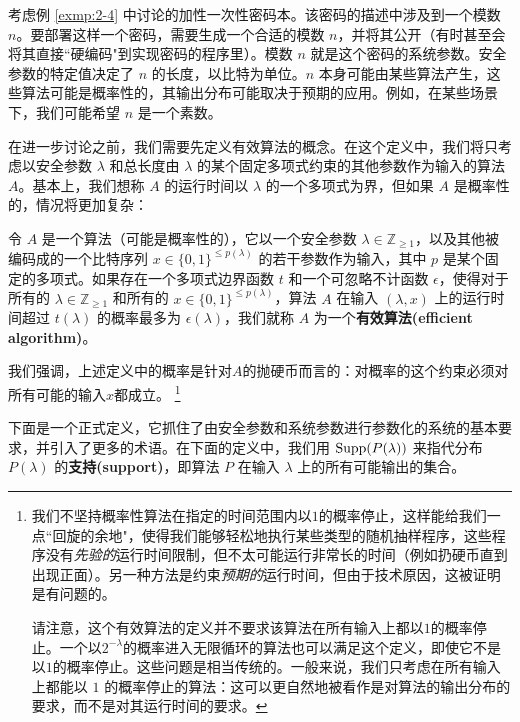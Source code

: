 \begin{example}\label{exmp:2-12}
考虑例 \ref{exmp:2-4} 中讨论的加性一次性密码本。该密码的描述中涉及到一个模数 $n$。要部署这样一个密码，需要生成一个合适的模数 $n$，并将其公开（有时甚至会将其直接``硬编码"到实现密码的程序里）。模数 $n$ 就是这个密码的系统参数。安全参数的特定值决定了 $n$ 的长度，以比特为单位。$n$ 本身可能由某些算法产生，这些算法可能是概率性的，其输出分布可能取决于预期的应用。例如，在某些场景下，我们可能希望 $n$ 是一个素数。
\end{example}

在进一步讨论之前，我们需要先定义有效算法的概念。在这个定义中，我们将只考虑以安全参数 $\lambda$ 和总长度由 $\lambda$ 的某个固定多项式约束的其他参数作为输入的算法 $A$。基本上，我们想称 $A$ 的运行时间以 $\lambda$ 的一个多项式为界，但如果 $A$ 是概率性的，情况将更加复杂：

\begin{definition}[有效算法]\label{def:2-8}
令 $A$ 是一个算法（可能是概率性的），它以一个安全参数 $\lambda\in\mathbb{Z}_{\geq1}$，以及其他被编码成的一个比特序列 $x\in\{0,1\}^{\leq p(\lambda)}$ 的若干参数作为输入，其中 $p$ 是某个固定的多项式。如果存在一个多项式边界函数 $t$ 和一个可忽略不计函数 $\epsilon$，使得对于所有的 $\lambda\in\mathbb{Z}_{\geq1}$ 和所有的 $x\in\{0,1\}^{\leq p(\lambda)}$，算法 $A$ 在输入 $(\lambda,x)$ 上的运行时间超过 $t(\lambda)$ 的概率最多为 $\epsilon(\lambda)$，我们就称 $A$ 为一个\textbf{有效算法(efficient algorithm)}。
\end{definition}

我们强调，上述定义中的概率是针对$A$的抛硬币而言的：对概率的这个约束必须对所有可能的输入$x$都成立。
\footnote{
\label{foot:2-1}
我们不坚持概率性算法在指定的时间范围内以$1$的概率停止，这样能给我们一点``回旋的余地"，使得我们能够轻松地执行某些类型的随机抽样程序，这些程序没有\emph{先验的}运行时间限制，但不太可能运行非常长的时间（例如扔硬币直到出现正面）。另一种方法是约束\emph{预期的}运行时间，但由于技术原因，这被证明是有问题的。

请注意，这个有效算法的定义并不要求该算法在所有输入上都以$1$的概率停止。一个以$2^{-\lambda}$的概率进入无限循环的算法也可以满足这个定义，即使它不是以$1$的概率停止。这些问题是相当传统的。一般来说，我们只考虑在所有输入上都能以 $1$ 的概率停止的算法：这可以更自然地被看作是对算法的输出分布的要求，而不是对其运行时间的要求。
}

\vspace{5pt}

下面是一个正式定义，它抓住了由安全参数和系统参数进行参数化的系统的基本要求，并引入了更多的术语。在下面的定义中，我们用 ${\rm Supp}(P(\lambda))$ 来指代分布 $P(\lambda)$ 的\textbf{支持(support)}，即算法 $P$ 在输入 $\lambda$ 上的所有可能输出的集合。


